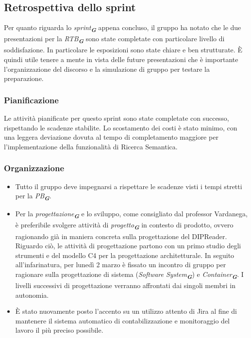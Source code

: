 \documentclass[a4paper,12pt]{article}
\newcommand{\glossario}[1]{\textit{#1}\textsubscript{\textbf{\textit{\textcolor{lightblack}{G}}}}}
\begin{document}
\subsection{Retrospettiva dello sprint}
Per quanto riguarda lo \glossario{sprint} appena concluso, il gruppo ha notato che le due presentazioni per la \glossario{RTB} sono state completate con particolare livello di soddisfazione. In particolare le esposizioni sono state chiare e ben strutturate. È quindi utile tenere a mente in vista delle future presentazioni che è importante l'organizzazione del discorso e la simulazione di gruppo per testare la preparazione. \\
\subsubsection{Pianificazione}
Le attività pianificate per questo sprint sono state completate con successo, rispettando le scadenze stabilite. Lo scostamento dei costi è stato minimo, con una leggera deviazione dovuta al tempo di completamento maggiore per l'implementazione della funzionalità di Ricerca Semantica.

\subsubsection{Organizzazione}
\begin{itemize}
    \item Tutto il gruppo deve impegnarsi a rispettare le scadenze visti i tempi stretti per la \glossario{PB}.
    \item Per la \glossario{progettazione} e lo sviluppo, come consigliato dal professor Vardanega, è preferibile svolgere attività di \glossario{progetto} in contesto di prodotto, ovvero ragionando già in maniera concreta sulla progettazione del DIPReader.
    \\ Riguardo ciò, le attività di progettazione partono con un primo studio degli strumenti e del modello C4 per la progettazione architetturale. In seguito all'infarinatura, per lunedì 2 marzo è fissato un incontro di gruppo per ragionare sulla progettazione di sistema (\glossario{\textit{Software System}}) e \glossario{\textit{Container}}. I livelli successivi di progettazione verranno affrontati dai singoli membri in autonomia.
    \item È stato nuovamente posto l'accento su un utilizzo attento di Jira al fine di mantenere il sistema automatico di contabilizzazione e monitoraggio del lavoro il più preciso possibile. 
\end{itemize}
\end{document}
